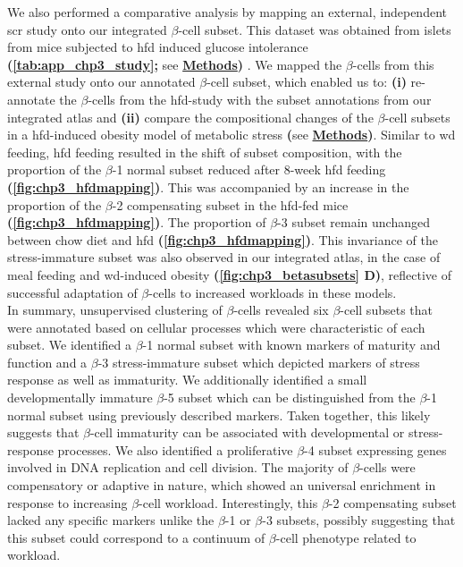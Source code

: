 \par We also performed a comparative analysis by mapping an external, independent \gls{scr} study onto our integrated  $\beta$-cell subset. This dataset was obtained from islets from mice subjected to \gls{hfd} induced glucose intolerance \textbf{(\autoref{tab:app_chp3_study};} see \hyperref[subsubsec:met_chp3_data]{\textbf{Methods}}\textbf{)} \textbf{\cite{fu_single-cell_2023}}. We mapped the $\beta$-cells from this external study onto our annotated $\beta$-cell subset, which enabled us to: \textbf{(i)} re-annotate the $\beta$-cells from the \gls{hfd}-study with the subset annotations from our integrated atlas and \textbf{(ii)} compare the compositional changes of the $\beta$-cell subsets in a \gls{hfd}-induced obesity model of metabolic stress \textbf{(}see \hyperref[subsubsec:met_chp3_validation]{\textbf{Methods}}\textbf{)}. Similar to \gls{wd} feeding, \gls{hfd} feeding resulted in the shift of subset composition, with the proportion of the $\beta$-1 normal subset reduced after 8-week \gls{hfd} feeding \textbf{(\autoref{fig:chp3_hfdmapping})}. This was accompanied by an increase in the proportion of the $\beta$-2 compensating subset in the \gls{hfd}-fed mice \textbf{(\autoref{fig:chp3_hfdmapping})}. The proportion of $\beta$-3 subset remain unchanged between chow diet and \gls{hfd} \textbf{(\autoref{fig:chp3_hfdmapping})}. This invariance of the stress-immature subset was also observed in our integrated atlas, in the case of meal feeding and \gls{wd}-induced obesity \textbf{(\autoref{fig:chp3_betasubsets} D)}, reflective of successful adaptation of $\beta$-cells to increased workloads in these models.\\


In summary, unsupervised clustering of $\beta$-cells revealed six $\beta$-cell subsets that were annotated based on cellular processes which were characteristic of each subset. We identified a $\beta$-1 normal subset with known markers of maturity and function and a $\beta$-3 stress-immature subset which depicted markers of stress response as well as immaturity. We additionally identified a small developmentally immature $\beta$-5 subset which can be distinguished from the $\beta$-1 normal subset using previously described markers. Taken together, this likely suggests that $\beta$-cell immaturity can be associated with developmental or stress-response processes. We also identified a proliferative $\beta$-4 subset expressing genes involved in DNA replication and cell division. The majority of $\beta$-cells were compensatory or adaptive in nature, which showed an universal enrichment in response to increasing $\beta$-cell workload. Interestingly, this $\beta$-2 compensating subset lacked any specific markers unlike the $\beta$-1 or $\beta$-3 subsets, possibly suggesting that this subset could correspond to a continuum of $\beta$-cell phenotype related to workload. 

